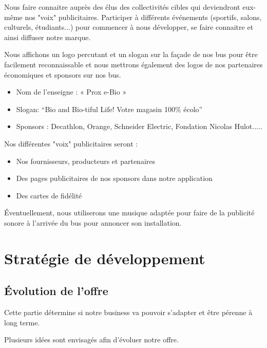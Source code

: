 \documentclass[12pt,a4paper]{report}
\begin{document}
				Nous faire connaitre auprès des élus des collectivités cibles qui deviendront eux-même nos "voix" publicitaires. Participer à différents événements (sportifs, salons, culturels, étudiants...) pour commencer à nous développer, se faire connaitre et ainsi diffuser notre marque.
				
				
				Nous affichons un logo percutant et un slogan sur la façade de nos bus pour être facilement reconnaissable et nous mettrons également des logos de nos partenaires économiques et sponsors sur nos bus.
				
\begin{itemize}
	\item Nom de l’enseigne : « Prox e-Bio »
	\item Slogan: “Bio and Bio-tiful Life! Votre magasin 100\% écolo”
	\item Sponsors : Decathlon, Orange, Schneider Electric, Fondation Nicolas Hulot..... 
\end{itemize}

\vspace{0.2cm}

Nos différentes "voix" publicitaires seront :
\begin{itemize}
	\item Nos fournisseurs, producteurs  et partenaires
	\item Des pages publicitaires de nos sponsors dans notre application 
	\item Des cartes de fidélité
\end{itemize}
	
Éventuellement, nous utiliserons une musique adaptée pour faire de la publicité sonore à l’arrivée du bus pour annoncer son installation.
				
				

				
		
		
	\chapter{Stratégie de développement}										
	
	
	
	\section{Évolution de l’offre}
	
	Cette partie détermine si notre business va pouvoir s’adapter et être pérenne à long terme.
	
	Plusieurs idées sont envisagés afin d'évoluer notre offre.
	
\end{document}
